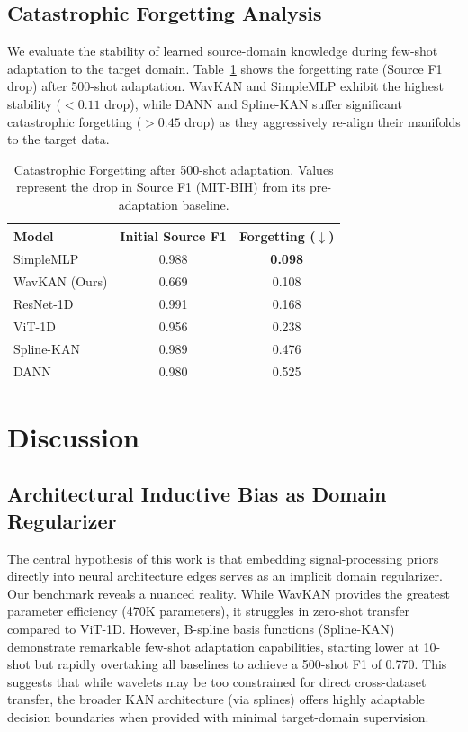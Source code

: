 \documentclass[journal,twoside,web]{ieeecolor}
\begin{document}
\subsection{Catastrophic Forgetting Analysis}

We evaluate the stability of learned source-domain knowledge during few-shot adaptation to the target domain. Table~\ref{tab:forgetting} shows the forgetting rate (Source F1 drop) after 500-shot adaptation. WavKAN and SimpleMLP exhibit the highest stability ($<0.11$ drop), while DANN and Spline-KAN suffer significant catastrophic forgetting ($>0.45$ drop) as they aggressively re-align their manifolds to the target data.

\begin{table}[!t]
\centering
\caption{Catastrophic Forgetting after 500-shot adaptation. Values represent the drop in Source F1 (MIT-BIH) from its pre-adaptation baseline.}
\label{tab:forgetting}
\begin{tabular}{@{}lcc@{}}
\toprule
\textbf{Model} & \textbf{Initial Source F1} & \textbf{Forgetting ($\downarrow$)} \\
\midrule
SimpleMLP      & 0.988 & \textbf{0.098} \\
WavKAN (Ours)  & 0.669 & 0.108 \\
ResNet-1D      & 0.991 & 0.168 \\
ViT-1D         & 0.956 & 0.238 \\
Spline-KAN     & 0.989 & 0.476 \\
DANN           & 0.980 & 0.525 \\
\bottomrule
\end{tabular}
\end{table}

\section{Discussion}

\subsection{Architectural Inductive Bias as Domain Regularizer}
The central hypothesis of this work is that embedding signal-processing priors directly into neural architecture edges serves as an implicit domain regularizer. Our benchmark reveals a nuanced reality. While WavKAN provides the greatest parameter efficiency (470K parameters), it struggles in zero-shot transfer compared to ViT-1D. However, B-spline basis functions (Spline-KAN) demonstrate remarkable few-shot adaptation capabilities, starting lower at 10-shot but rapidly overtaking all baselines to achieve a 500-shot F1 of 0.770. This suggests that while wavelets may be too constrained for direct cross-dataset transfer, the broader KAN architecture (via splines) offers highly adaptable decision boundaries when provided with minimal target-domain supervision.
\end{document}
